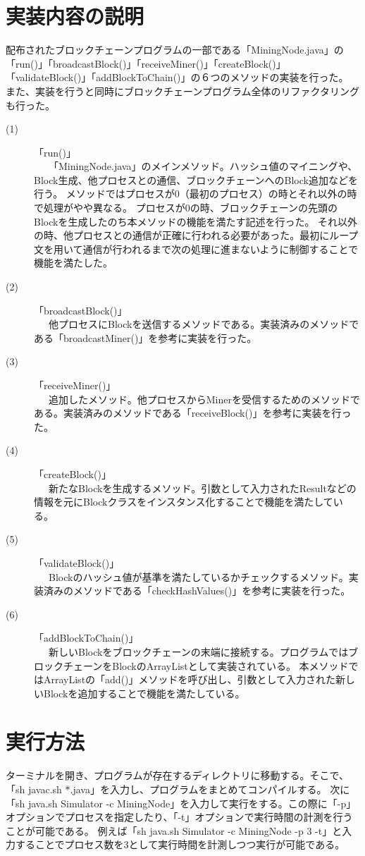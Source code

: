 \documentclass[uplatex, twocolumn,10pt]{jsarticle}
\begin{document}
\section{実装内容の説明}
配布されたブロックチェーンプログラムの一部である「MiningNode.java」の「run()」「broadcastBlock()」「receiveMiner()」「createBlock()」「validateBlock()」「addBlockToChain()」の６つのメソッドの実装を行った。
また、実装を行うと同時にブロックチェーンプログラム全体のリファクタリングも行った。
\begin{description}
  \item[(1)]  「run()」
  \\\ \ \ 「MiningNode.java」のメインメソッド。ハッシュ値のマイニングや、Block生成、他プロセスとの通信、ブロックチェーンへのBlock追加などを行う。
  メソッドではプロセスが0（最初のプロセス）の時とそれ以外の時で処理がやや異なる。
  プロセスが0の時、ブロックチェーンの先頭のBlockを生成したのち本メソッドの機能を満たす記述を行った。
  それ以外の時、他プロセスとの通信が正確に行われる必要があった。最初にループ文を用いて通信が行われるまで次の処理に進まないように制御することで機能を満たした。
  \item[(2)]  「broadcastBlock()」
  \\\ \ \ 他プロセスにBlockを送信するメソッドである。実装済みのメソッドである「broadcastMiner()」を参考に実装を行った。
  \item[(3)]  「receiveMiner()」
  \\\ \ \ 追加したメソッド。他プロセスからMinerを受信するためのメソッドである。実装済みのメソッドである「receiveBlock()」を参考に実装を行った。
  \item[(4)]  「createBlock()」
  \\\ \ \ 新たなBlockを生成するメソッド。引数として入力されたResultなどの情報を元にBlockクラスをインスタンス化することで機能を満たしている。
  \item[(5)]  「validateBlock()」
  \\\ \ \ Blockのハッシュ値が基準を満たしているかチェックするメソッド。実装済みのメソッドである「checkHashValues()」を参考に実装を行った。
  \item[(6)]  「addBlockToChain()」
  \\\ \ \ 新しいBlockをブロックチェーンの末端に接続する。プログラムではブロックチェーンをBlockのArrayListとして実装されている。
  本メソッドではArrayListの「add()」メソッドを呼び出し、引数として入力された新しいBlockを追加することで機能を満たしている。
\end{description}

\section{実行方法}
ターミナルを開き、プログラムが存在するディレクトリに移動する。そこで、「sh javac.sh *.java」を入力し、プログラムをまとめてコンパイルする。
次に「sh java.sh Simulator -c MiningNode」を入力して実行をする。この際に「-p」オプションでプロセスを指定したり、「-t」オプションで実行時間の計測を行うことが可能である。
例えば「sh java.sh Simulator -c MiningNode -p 3 -t」と入力することでプロセス数を3として実行時間を計測しつつ実行が可能である。
\end{document}
